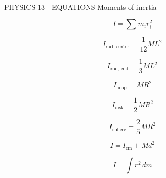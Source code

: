 PHYSICS 13 - EQUATIONS
Moments of inertia

$$I = \sum m_i r_i^2$$

$$I_{\text{rod, center}} = \frac{1}{12}ML^2$$

$$I_{\text{rod, end}} = \frac13 ML^2$$

$$I_{\text{hoop}} = MR^2$$

$$I_{\text{disk}} = \frac12 MR^2$$

$$I_{\text{sphere}} = \frac25 MR^2$$

$$I = I_{\text{cm}} + Md^2$$


$$I=\int r^2\,dm$$
